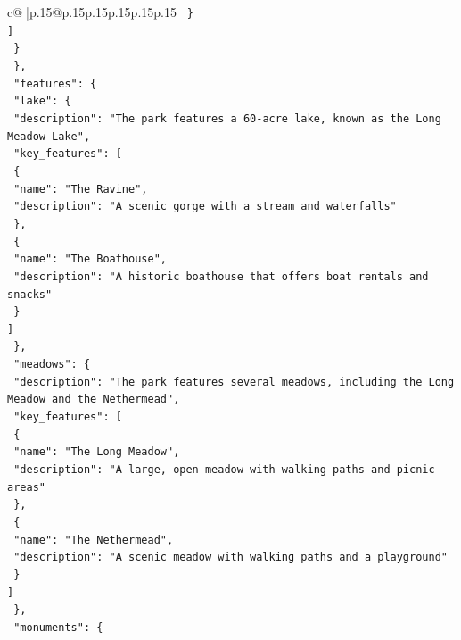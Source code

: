 \documentclass{article}
\begin{document}
{\begin{supertabular}{c@{$\;$}|p{.15\linewidth}@{}p{.15\linewidth}p{.15\linewidth}p{.15\linewidth}p{.15\linewidth}p{.15\linewidth}}
{{{\texttt{        \}} \\
\texttt{      {]}} \\
\texttt{    \}} \\
\texttt{  \},} \\
\texttt{  "features": \{} \\
\texttt{    "lake": \{} \\
\texttt{      "description": "The park features a 60{-}acre lake, known as the Long Meadow Lake",} \\
\texttt{      "key\_features": {[}} \\
\texttt{        \{} \\
\texttt{          "name": "The Ravine",} \\
\texttt{          "description": "A scenic gorge with a stream and waterfalls"} \\
\texttt{        \},} \\
\texttt{        \{} \\
\texttt{          "name": "The Boathouse",} \\
\texttt{          "description": "A historic boathouse that offers boat rentals and snacks"} \\
\texttt{        \}} \\
\texttt{      {]}} \\
\texttt{    \},} \\
\texttt{    "meadows": \{} \\
\texttt{      "description": "The park features several meadows, including the Long Meadow and the Nethermead",} \\
\texttt{      "key\_features": {[}} \\
\texttt{        \{} \\
\texttt{          "name": "The Long Meadow",} \\
\texttt{          "description": "A large, open meadow with walking paths and picnic areas"} \\
\texttt{        \},} \\
\texttt{        \{} \\
\texttt{          "name": "The Nethermead",} \\
\texttt{          "description": "A scenic meadow with walking paths and a playground"} \\
\texttt{        \}} \\
\texttt{      {]}} \\
\texttt{    \},} \\
\texttt{    "monuments": \{} \\
}}}
\end{supertabular}}
\end{document}
